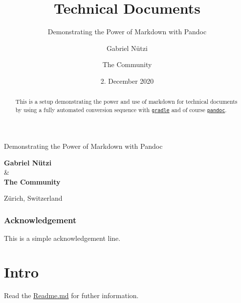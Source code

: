 \documentclass[
  british,
  12pt,
  paper=a4,
  twoside,
  titlepage=true,
  openright,
  abstract=on,
  toc=listofnumbered,
  numbers=noenddot,
  chapterprefix=true,
  headings=optiontohead,
  svgnames,
  dvipsnames]{scrreprt}
\title{Technical Documents}
\subtitle{Demonstrating the Power of Markdown with Pandoc}
\author{Gabriel Nützi \and The Community}
\date{2. December 2020}
\begin{document}
\begin{titlepage}
\makeatletter
\begin{center}

\end{center}
\vspace{1cm}
\begin{center}
\Huge \textbf{\@title}
\end{center}
\begin{center}
\LARGE Demonstrating the Power of Markdown with Pandoc
\end{center}
\vspace{1cm}
\begin{center}
\textbf{Gabriel Nützi} \\ \& \\ \textbf{The Community}
\end{center}
\begin{center}
\@date
\end{center}
\begin{center}
\vfill
Zürich, Switzerland
\vspace{1cm}
\end{center}
\makeatother
\end{titlepage}
\begin{abstract}
This is a setup demonstrating the power and use of markdown for
technical documents by using a fully automated conversion sequence with
\href{https://gradle.org}{\texttt{gradle}} and of course
\href{https://pandoc.org}{\texttt{pandoc}}.
\end{abstract}
\pagestyle{plain}
\hypertarget{acknowledgement}{%
\subsection*{Acknowledgement}\label{acknowledgement}}

This is a simple acknowledgement line.
\cleardoublepage

\pagestyle{headings}

{
\hypersetup{linkcolor=Black}
\setcounter{tocdepth}{2}
\tableofcontents
}
\hypertarget{intro}{%
\chapter{Intro}\label{intro}}

Read the
\href{https://github.com/gabyx/TechnicalMarkdown/blob/master/Readme.md}{Readme.md}
for futher information.
\end{document}
